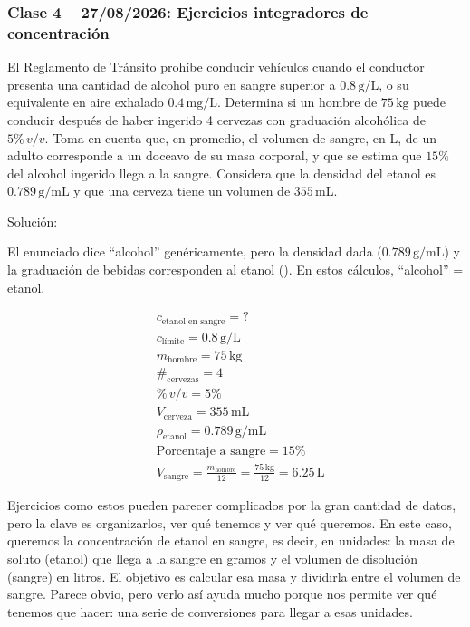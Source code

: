 {}
\subsubsection*{\textcolor{blueunam}{Clase 4 -- 27/08/2026: Ejercicios integradores de concentración}}

\begin{exercise}{}{}
El Reglamento de Tránsito prohíbe conducir vehículos cuando el conductor 
presenta una cantidad de alcohol puro en sangre superior a $0.8\,\mathrm{g/L}$, 
o su equivalente en aire exhalado $0.4\,\mathrm{mg/L}$. Determina si un hombre 
de $75\,\mathrm{kg}$ puede conducir después de haber ingerido 4 cervezas con 
graduación alcohólica de $5\%\,v/v$. Toma en cuenta que, en promedio, el volumen 
de sangre, en L, de un adulto corresponde a un doceavo de su masa corporal, y 
que se estima que $15\%$ del alcohol ingerido llega a la sangre. Considera que 
la densidad del etanol es $0.789\,\mathrm{g/mL}$ y que una cerveza tiene un 
volumen de $355\,\mathrm{mL}$.

Solución:

\begin{notaimportante}
El enunciado dice ``alcohol'' genéricamente, pero la densidad dada 
($0.789\,\mathrm{g/mL}$) y la graduación de bebidas corresponden al etanol 
(). En estos cálculos, ``alcohol'' = etanol.
\end{notaimportante}

\begin{align*}
    &c_{\text{etanol en sangre}} = ? \\[4pt]
    &c_{\text{límite}} = 0.8\,\mathrm{g/L} \\[4pt]
    &m_{\text{hombre}} = 75\,\mathrm{kg} \\[4pt]
    &\#_{\text{cervezas}} = 4 \\[4pt]
    &\%\,v/v = 5\% \\[4pt]
    &V_{\text{cerveza}} = 355\,\mathrm{mL} \\[4pt]
    &\rho_{\text{etanol}} = 0.789\,\mathrm{g/mL} \\[4pt]
    &\text{Porcentaje a sangre} = 15\% \\[4pt]
    &V_{\text{sangre}} = \frac{m_{\text{hombre}}}{12} 
    = \frac{75\,\mathrm{kg}}{12}
    = 6.25\,\mathrm{L}
\end{align*}

Ejercicios como estos pueden parecer complicados por la gran cantidad de datos, 
pero la clave es organizarlos, ver qué tenemos y ver qué queremos. En este caso, 
queremos la concentración de etanol en sangre, es decir, en unidades: la masa 
de soluto (etanol) que llega a la sangre en gramos y el volumen de disolución 
(sangre) en litros. El objetivo es calcular esa masa y dividirla entre el volumen 
de sangre. Parece obvio, pero verlo así ayuda mucho porque nos permite ver qué 
tenemos que hacer: una serie de conversiones para llegar a esas unidades. \\


\end{exercise}
